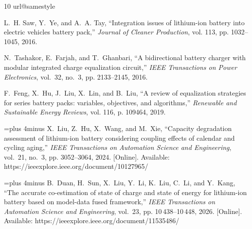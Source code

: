 \documentclass[10pt,journal,letterpaper]{IEEEtran}
\begin{document}
\begin{thebibliography}{10}
\providecommand{\url}[1]{#1}
\csname url@samestyle\endcsname
\providecommand{\newblock}{\relax}
\providecommand{\bibinfo}[2]{#2}
\providecommand{\BIBentrySTDinterwordspacing}{\spaceskip=0pt\relax}
\providecommand{\BIBentryALTinterwordstretchfactor}{4}
\providecommand{\BIBentryALTinterwordspacing}{\spaceskip=\fontdimen2\font plus
\BIBentryALTinterwordstretchfactor\fontdimen3\font minus
  \fontdimen4\font\relax}
\providecommand{\BIBforeignlanguage}[2]{{%
\expandafter\ifx\csname l@#1\endcsname\relax
\typeout{** WARNING: IEEEtran.bst: No hyphenation pattern has been}%
\typeout{** loaded for the language `#1'. Using the pattern for}%
\typeout{** the default language instead.}%
\else
\language=\csname l@#1\endcsname
\fi
#2}}
\providecommand{\BIBdecl}{\relax}
\BIBdecl

L.~H. Saw, Y.~Ye, and A.~A. Tay, ``Integration issues of lithium-ion battery
  into electric vehicles battery pack,'' \emph{Journal of Cleaner Production},
  vol. 113, pp. 1032--1045, 2016.

N.~Tashakor, E.~Farjah, and T.~Ghanbari, ``A bidirectional battery charger with
  modular integrated charge equalization circuit,'' \emph{IEEE Transactions on
  Power Electronics}, vol.~32, no.~3, pp. 2133--2145, 2016.

F.~Feng, X.~Hu, J.~Liu, X.~Lin, and B.~Liu, ``A review of equalization
  strategies for series battery packs: variables, objectives, and algorithms,''
  \emph{Renewable and Sustainable Energy Reviews}, vol. 116, p. 109464, 2019.

\BIBentryALTinterwordspacing
X.~Liu, Z.~Hu, X.~Wang, and M.~Xie, ``Capacity degradation assessment of
  lithium-ion battery considering coupling effects of calendar and cycling
  aging,'' \emph{IEEE Transactions on Automation Science and Engineering},
  vol.~21, no.~3, pp. 3052--3064, 2024. [Online]. Available:
  \url{https://ieeexplore.ieee.org/document/10127965/}
\BIBentrySTDinterwordspacing

\BIBentryALTinterwordspacing
B.~Duan, H.~Sun, X.~Liu, Y.~Li, K.~Liu, C.~Li, and Y.~Kang, ``The accurate
  co-estimation of state of charge and state of energy for lithium-ion battery
  based on model-data fused framework,'' \emph{IEEE Transactions on Automation
  Science and Engineering}, vol.~23, pp. 10\,438--10\,448, 2026. [Online].
  Available: \url{https://ieeexplore.ieee.org/document/11535486/}
\BIBentrySTDinterwordspacing


\end{thebibliography}
\end{document}
